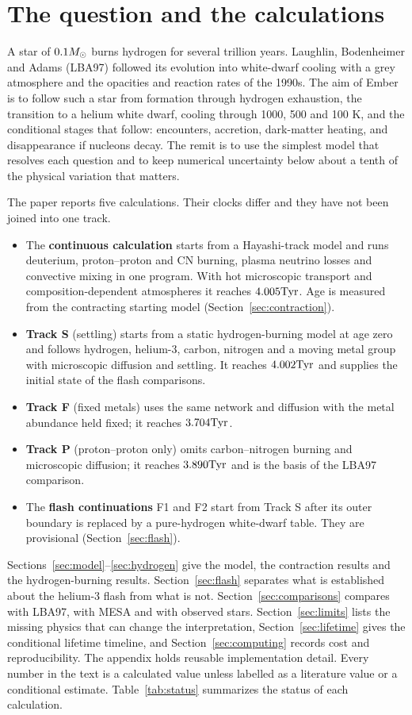 \section{The question and the calculations}
A star of $0.1M_\odot$ burns hydrogen for several trillion years. Laughlin,
Bodenheimer and Adams \cite{lba97} (LBA97) followed its evolution into
white-dwarf cooling with a grey atmosphere and the opacities and reaction
rates of the 1990s. The aim of Ember is to follow such
a star from formation through hydrogen exhaustion, the transition to a helium
white dwarf, cooling through 1000, 500 and 100 K, and the conditional stages
that follow: encounters, accretion, dark-matter heating, and disappearance if
nucleons decay. The remit is to use the simplest model that resolves each
question and to keep numerical uncertainty below about a tenth of the
physical variation that matters.

The paper reports five calculations. Their clocks differ and they have not
been joined into one track.
\begin{itemize}
\item The \textbf{continuous calculation} starts from a Hayashi-track model
and runs deuterium, proton--proton and CN burning, plasma neutrino losses and
convective mixing in one program. With hot microscopic transport and
composition-dependent atmospheres it reaches $4.005\mathrm{Tyr}$.
Age is measured from the contracting starting model (Section~\ref{sec:contraction}).
\item \textbf{Track S} (settling) starts from a static hydrogen-burning model
at age zero and follows hydrogen, helium-3, carbon, nitrogen and a moving
metal group with microscopic diffusion and settling. It reaches
$4.002\mathrm{Tyr}$ and supplies the initial state of the flash comparisons.
\item \textbf{Track F} (fixed metals) uses the same network and diffusion
with the metal abundance held fixed; it reaches $3.704\mathrm{Tyr}$.
\item \textbf{Track P} (proton--proton only) omits carbon--nitrogen burning
and microscopic diffusion; it reaches $3.890\mathrm{Tyr}$ and is the basis of the
LBA97 comparison.
\item The \textbf{flash continuations} F1 and F2 start from Track S after
its outer boundary is replaced by a pure-hydrogen white-dwarf table. They are
provisional (Section~\ref{sec:flash}).
\end{itemize}

Sections~\ref{sec:model}--\ref{sec:hydrogen} give the model, the
contraction results and the hydrogen-burning results. Section~\ref{sec:flash}
separates what is established about the helium-3 flash from what is not.
Section~\ref{sec:comparisons} compares with LBA97, with MESA and with
observed stars. Section~\ref{sec:limits} lists the missing physics that can
change the interpretation, Section~\ref{sec:lifetime} gives the conditional
lifetime timeline, and Section~\ref{sec:computing} records cost and
reproducibility. The appendix holds reusable implementation detail.
Every number in the text is a calculated value unless labelled as a
literature value or a conditional estimate. Table~\ref{tab:status}
summarizes the status of each calculation.

